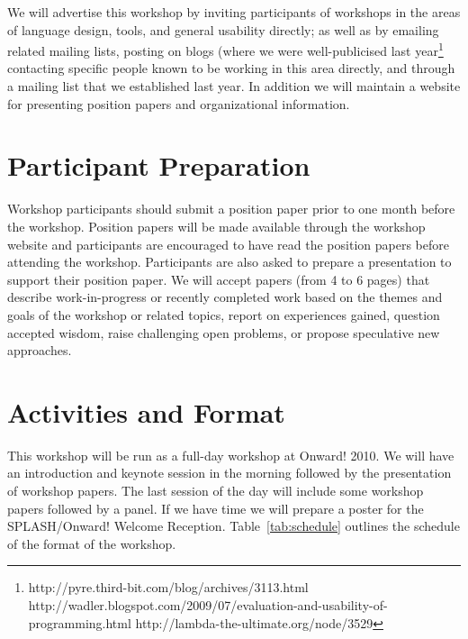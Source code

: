 \documentclass[authorpermission]{sigplanconf}
\begin{document}
We will advertise this workshop by inviting participants of workshops
in the areas of language design, tools, and general usability
directly; as well as by emailing related mailing lists, posting on
blogs (where we were well-publicised last
year\footnote{http://pyre.third-bit.com/blog/archives/3113.html
http://wadler.blogspot.com/2009/07/evaluation-and-usability-of-programming.html
http://lambda-the-ultimate.org/node/3529}
contacting specific people known to be working in this area directly,
and through a mailing list that we established last year. In
addition we will maintain a website for presenting position papers and organizational
information.

\section{Participant Preparation}

Workshop participants should submit a position paper prior to one
month before the workshop. Position papers will be made available
through the workshop website and participants are encouraged to have
read the position papers before attending the workshop. Participants
are also asked to prepare a presentation to support their position
paper. We will accept papers (from 4 to 6 pages) that describe
work-in-progress or recently completed work based on the themes and
goals of the workshop or related topics, report on experiences gained,
question accepted wisdom, raise challenging open problems, or propose
speculative new approaches.

\section{Activities and Format}

This workshop will be run as a full-day workshop at Onward! 2010.  We
will have an introduction and keynote session in the morning followed
by the presentation of workshop papers.  The last session of the day
will include some workshop papers followed by a panel. 
If we have time we will prepare a poster for the
SPLASH/Onward! Welcome Reception.  Table~\ref{tab:schedule} outlines the
schedule of the format of the workshop.
\end{document}
